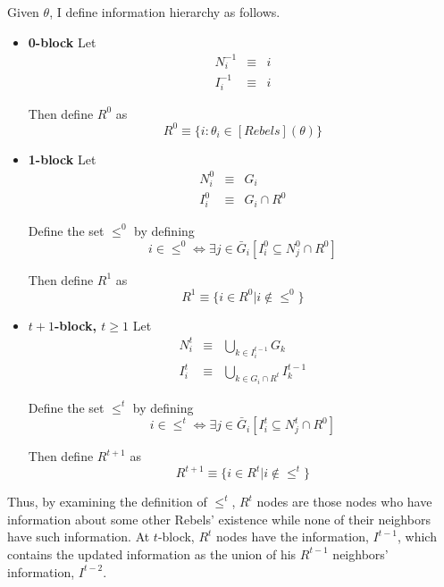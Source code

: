 \documentclass[12pt,letterpaper]{article}
\theoremstyle{definition}
\theoremstyle{remark}
\theoremstyle{claim}
\begin{document}
Given $\theta$, I define information hierarchy as follows.
\begin{itemize}

\item \textbf{0-block}
Let
\begin{eqnarray*}
N^{-1}_i &\equiv &  i \\
I^{-1}_i & \equiv & i
\end{eqnarray*}

Then define $R^0$ as 
\begin{equation}
R^0\equiv\{i:\theta_i\in[Rebels](\theta)\}
\end{equation}

\item \textbf{1-block}
Let
\begin{eqnarray*}
N^0_i &\equiv &  G_i \\
I^0_i & \equiv & G_i\cap R^0
\end{eqnarray*}

Define the set $\leq^0$ by defining
\begin{equation}i\in \leq^0 \Leftrightarrow \exists  j\in \bar{G}_i [I^0_i\subseteq N^0_j\cap R^0]\end{equation}  

Then define $R^1$ as 
\begin{equation}
R^{1} \equiv \{i\in R^0|i\notin \leq^0\}
\end{equation}

\item \textbf{$t+1$-block, $t\geq 1$}
Let
\begin{eqnarray*}
N^t_i & \equiv & \bigcup_{k\in I^{t-1}_i}G_k \\
I^t_i & \equiv & \bigcup_{k\in G_i\cap R^t}I^{t-1}_k
\end{eqnarray*}


Define the set $\leq^t$ by defining
\begin{equation}i\in \leq^t \Leftrightarrow \exists j\in \bar{G}_i[I^t_i\subseteq N^t_j\cap R^0]\end{equation}

Then define $R^{t+1}$ as 
\begin{equation}
R^{t+1} \equiv  \{i\in R^t|i\notin \leq^t\}
\end{equation}


\end{itemize}

Thus, by examining the definition of $\leq^t$, $R^t$ nodes are those nodes who have information about some other Rebels' existence while none of their neighbors have such information. At $t$-block, $R^t$ nodes have the information, $I^{t-1}$, which contains the updated information as the union of his $R^{t-1}$ neighbors' information, $I^{t-2}$. 
\end{document}
